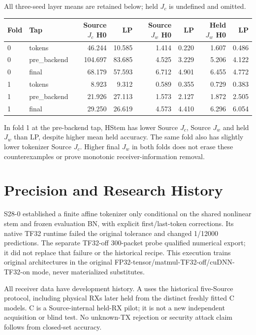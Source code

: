 \documentclass[10pt]{article}
\begin{document}
All three-seed layer means are retained below; held $J_c$ is undefined and omitted.
\begin{center}\scriptsize\begin{tabular}{llrrrrrr}\toprule
Fold&Tap&Source $J_c$ H0&LP&Source $J_w$ H0&LP&Held $J_w$ H0&LP\\\midrule
0&tokens&46.244&10.585&1.414&0.220&1.607&0.486\\
0&pre\_backend&104.697&83.685&4.525&3.229&5.206&4.122\\
0&final&68.179&57.593&6.712&4.901&6.455&4.772\\
1&tokens&8.923&9.312&0.589&0.355&0.729&0.383\\
1&pre\_backend&21.926&27.113&1.573&2.127&1.872&2.505\\
1&final&29.250&26.619&4.573&4.410&6.296&6.054\\
\bottomrule\end{tabular}\end{center}
In fold 1 at the pre-backend tap, HStem has lower Source $J_c$, Source $J_w$ and held $J_w$ than LP, despite higher mean held accuracy. The same fold also has slightly lower tokenizer Source $J_c$. Higher final $J_w$ in both folds does not erase these counterexamples or prove monotonic receiver-information removal.
\section{Precision and Research History}
S28-0 established a finite affine tokenizer only conditional on the shared nonlinear stem and frozen evaluation BN, with explicit first/last-token corrections. Its native TF32 runtime failed the original tolerance and changed 1/12000 predictions. The separate TF32-off 300-packet probe qualified numerical export; it did not replace that failure or the historical recipe. This execution trains original architectures in the original FP32-tensor/matmul-TF32-off/cuDNN-TF32-on mode, never materialized substitutes.

All receiver data have development history. A uses the historical five-Source protocol, including physical RXs later held from the distinct freshly fitted C models. C is a Source-internal held-RX pilot; it is not a new independent acquisition or blind test. No unknown-TX rejection or security attack claim follows from closed-set accuracy.
\end{document}

